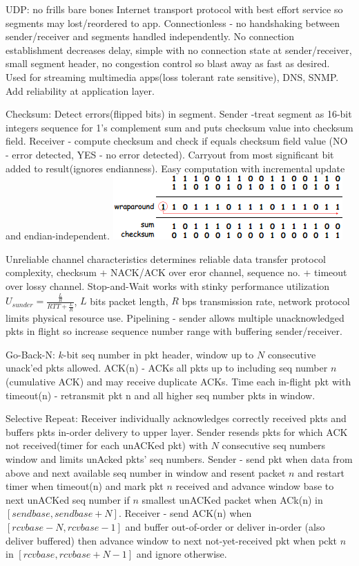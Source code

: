 \documentclass[9pt]{extarticle}
\begin{document}
\begin{multicols}{2}
UDP: no frills bare bones Internet transport protocol with best effort service so segments may lost/reordered to app. Connectionless - no handshaking between sender/receiver and segments handled independently. No connection establishment decreases delay, simple with no connection state at sender/receiver, small segment header, no congestion control so blast away as fast as desired. Used for streaming multimedia apps(loss tolerant rate sensitive), DNS, SNMP. Add reliability at application layer. 

Checksum: Detect errors(flipped bits) in segment. Sender -treat segment as 16-bit integers sequence for 1’s complement sum and puts checksum value into checksum field. Receiver - compute checksum and check if equals checksum field value (NO - error detected, YES - no error detected). Carryout from most significant bit added to result(ignores endianness). Easy computation with incremental update and endian-independent. 
\includegraphics{checksum.png}

Unreliable channel characteristics determines reliable data transfer protocol complexity, checksum + NACK/ACK over eror channel, sequence no. + timeout over lossy channel. Stop-and-Wait works with stinky performance utilization $U_{sunder} = \frac{\frac{L}{R}}{RTT + \frac{L}{R}}$, $L$ bits packet length, $R$ bps transmission rate, network protocol limits physical resource use. Pipelining - sender allows multiple unacknowledged pkts in flight so increase sequence number range with buffering sender/receiver.

Go-Back-N: $k$-bit seq number in pkt header, window up to $N$ consecutive unack’ed pkts allowed. ACK(n) - ACKs all pkts up to including seq number $n$(cumulative ACK) and may receive duplicate ACKs. Time each in-flight pkt with timeout(n) - retransmit pkt n and all higher seq number pkts in window.

Selective Repeat: Receiver individually acknowledges correctly received pkts and buffers pkts in-order delivery to upper layer. Sender resends pkts for which ACK not received(timer for each unACKed pkt) with $N$ consecutive seq numbers window and limits unAcked pkts' seq numbers. Sender - send pkt when data from above and next available seq number in window and resent packet $n$ and restart timer when timeout(n) and mark pkt $n$ received and advance window base to next unACKed seq number if $n$ smallest unACKed packet when ACk(n) in $[sendbase, sendbase+N]$. Receiver - send ACK(n) when $[rcvbase-N,rcvbase-1]$ and buffer out-of-order or deliver in-order (also deliver buffered) then advance window to next not-yet-received pkt when pckt $n$ in $[rcvbase, rcvbase+N-1]$  and ignore otherwise.


\end{multicols}
\end{document}
